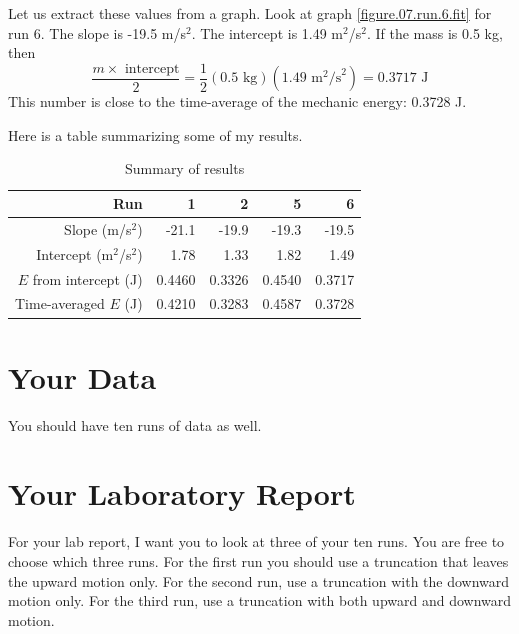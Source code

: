 Let us extract these values from a graph. Look at graph \ref{figure.07.run.6.fit} for run 6. The slope is -19.5 m/s$^{2}$. The intercept is 1.49 m$^{2}$/s$^{2}$. If the mass is 0.5 kg, then
\begin{equation}
    \frac{m \times \text{ intercept}}{2} = \frac{1}{2} (0.5 \text{ kg}) (1.49 \text{ m}^{2}\text{/s}^{2}) = 0.3717 \text{ J}
\end{equation}
This number is close to the time-average of the mechanic energy: 0.3728 J.

Here is a table summarizing some of my results.
\begin{table}
	\centering
    \begin{tabular}{|r|r|r|r|r|}\hline
        Run & 1 & 2 & 5 & 6 \\ \hline
        Slope (m/s$^{2}$) & -21.1 & -19.9 & -19.3 & -19.5 \\
        Intercept (m$^{2}$/s$^{2}$) & 1.78 & 1.33 & 1.82 & 1.49 \\
        $E$ from intercept (J) & 0.4460 & 0.3326 & 0.4540 & 0.3717 \\
        Time-averaged $E$ (J) & 0.4210 & 0.3283 & 0.4587 & 0.3728 \\
        \hline
    \end{tabular}
    \caption{Summary of results}
    \label{table.07.results}
\end{table}
\section{Your Data}
You should have ten runs of data as well.
\newpage
\section{Your Laboratory Report}
For your lab report, I want you to look at three of your ten runs. You are free to choose which three runs. For the first run you should use a truncation that leaves the upward motion only. For the second run, use a truncation with the downward motion only. For the third run, use a truncation with both upward and downward motion.

